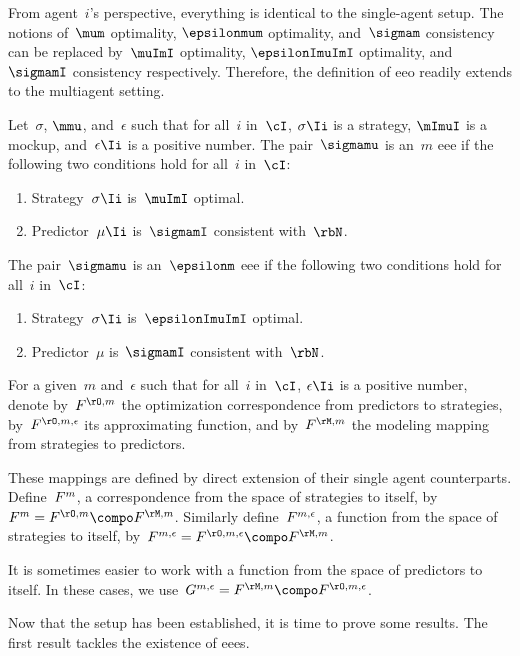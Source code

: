 From agent~\(i\)'s perspective, everything is identical to the single-agent setup.
The notions of~\(\mum\) optimality, \(\epsilonmum\) optimality, and~\(\sigmam\) consistency can be replaced by~\(\muImI\) optimality, \(\epsilonImuImI\) optimality, and~\(\sigmamI\) consistency respectively.
Therefore, the definition of \ac{eeo} readily extends to the multiagent setting.

\begin{definition}
\label{def:eee}
Let~\(\sigma\), \(\mmu\), and~\(\epsilon\) such that for all~\(i\) in~\(\cI\), \(\sigma\Ii\) is a strategy, \(\mImuI\) is a mockup, and~\(\epsilon\Ii\) is a positive number.
The pair~\(\sigmamu\) is an~\(m\) \ac{eee} if the following two conditions hold for all~\(i\) in~\(\cI\):
\begin{enumerate}
\item Strategy~\(\sigma\Ii\) is~\(\muImI\) optimal.
\item Predictor~\(\mu\Ii\) is~\(\sigmamI\) consistent with~\(\rbN\).
\end{enumerate}
The pair~\(\sigmamu\) is an~\(\epsilonm\) \ac{eee} if the following two conditions hold for all~\(i\) in~\(\cI\):
\begin{enumerate}
\item Strategy~\(\sigma\Ii\) is~\(\epsilonImuImI\) optimal.
\item Predictor~\(\mu\) is~\(\sigmamI\) consistent with~\(\rbN\).
\end{enumerate}
\end{definition}

For a given~\(m\) and~\(\epsilon\) such that for all~\(i\) in~\(\cI\), \(\epsilon\Ii\) is a positive number, denote by~\(\FO\) the optimization correspondence from predictors to strategies, by~\(\FOe\) its approximating function, and by~\(\FM\) the modeling mapping from strategies to  predictors.

These mappings are defined by direct extension of their single agent counterparts.
Define~\(F^{m}\), a correspondence from the space of strategies to itself, by~\(\FF = \FO \compo \FM\).
Similarly define~\(F^{m, \epsilon}\), a function from the space of strategies to itself, by~\(\FFe = \FOe \compo \FM\).

It is sometimes easier to work with a function from the space of predictors to itself.
In these cases, we use~\(\GGe = \FM \compo \FOe\).

Now that the setup has been established, it is time to prove some results.
The first result tackles the existence of \acp{eee}.

